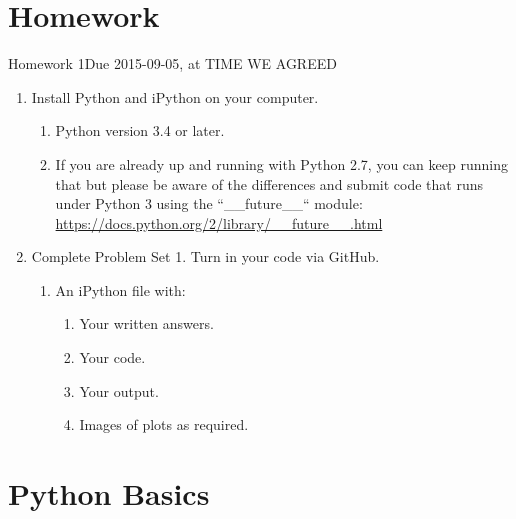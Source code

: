 \section{Homework}
\begin{frame}{Homework 1}{Due 2015-09-05, at TIME WE AGREED}
\begin{enumerate}
  \item Install Python and iPython on your computer.
  \begin{enumerate}
    \item Python version 3.4 or later.
    \item If you are already up and running with Python 2.7, you can keep running that but please be aware of the differences and submit code that runs under Python 3 using the ``\_\_future\_\_`` module: \url{https://docs.python.org/2/library/\_\_future\_\_.html}
  \end{enumerate}
  \item Complete Problem Set 1. Turn in your code via GitHub.
  \begin{enumerate}
    \item An iPython file with:
    \begin{enumerate}
      \item Your written answers.
      \item Your code.
      \item Your output.
      \item Images of plots as required.
    \end{enumerate}
  \end{enumerate}
\end{enumerate}
\end{frame}


\section{Python Basics}


%


